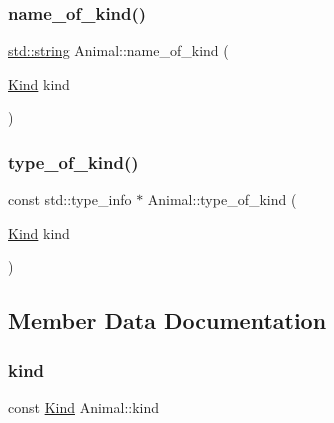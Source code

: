 \subsubsection{\texorpdfstring{name\_of\_kind()}{name\_of\_kind()}}
{\footnotesize\ttfamily \mbox{\hyperlink{_s_d_l__opengl__glext_8h_ab4ccfaa8ab0e1afaae94dc96ef52dde1}{std\+::string}} Animal\+::name\+\_\+of\+\_\+kind (\begin{DoxyParamCaption}\item[{\mbox{\hyperlink{struct_animal_abd6bed3bf6361cc3dc37c03f297e3f48}{Kind}}}]{kind }\end{DoxyParamCaption})\hspace{0.3cm}{\ttfamily [static]}}

\mbox{\label{struct_animal_aabe01c9a2ed53acd395e9cd699259814}} 
\subsubsection{\texorpdfstring{type\_of\_kind()}{type\_of\_kind()}}
{\footnotesize\ttfamily const std\+::type\+\_\+info $\ast$ Animal\+::type\+\_\+of\+\_\+kind (\begin{DoxyParamCaption}\item[{\mbox{\hyperlink{struct_animal_abd6bed3bf6361cc3dc37c03f297e3f48}{Kind}}}]{kind }\end{DoxyParamCaption})\hspace{0.3cm}{\ttfamily [static]}}



\subsection{Member Data Documentation}
\mbox{\label{struct_animal_afd764a2f40502e0417c8691f7137ac3a}} 
\subsubsection{\texorpdfstring{kind}{kind}}
{\footnotesize\ttfamily const \mbox{\hyperlink{struct_animal_abd6bed3bf6361cc3dc37c03f297e3f48}{Kind}} Animal\+::kind}

\mbox{\label{struct_animal_a3415d6574598b7a36266e027c7b28b7d}} 
